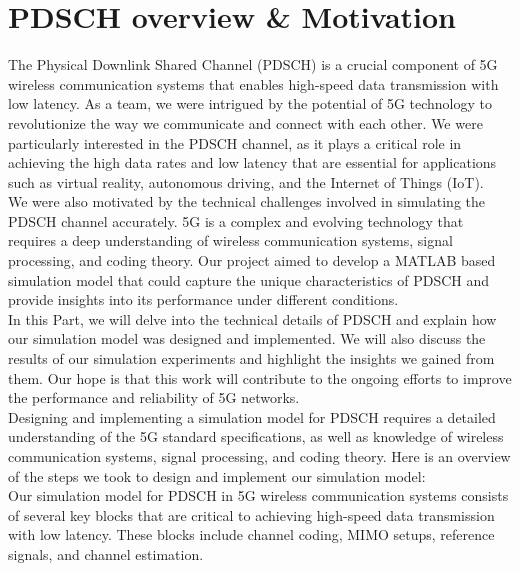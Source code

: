 \section*{PDSCH overview \& Motivation}

The Physical Downlink Shared Channel (PDSCH) is a crucial component of 5G wireless communication systems that enables high-speed data transmission with low latency. As a team, we were intrigued by the potential of 5G technology to revolutionize the way we communicate and connect with each other. We were particularly interested in the PDSCH channel, as it plays a critical role in achieving the high data rates and low latency that are essential for applications such as virtual reality, autonomous driving, and the Internet of Things (IoT). \\
We were also motivated by the technical challenges involved in simulating the PDSCH channel accurately. 5G is a complex and evolving technology that requires a deep understanding of wireless communication systems, signal processing, and coding theory. Our project aimed to develop a MATLAB based simulation model that could capture the unique characteristics of PDSCH and provide insights into its performance under different conditions. \\

In this Part, we will delve into the technical details of PDSCH and explain how our simulation model was designed and implemented. We will also discuss the results of our simulation experiments and highlight the insights we gained from them. Our hope is that this work will contribute to the ongoing efforts to improve the performance and reliability of 5G networks. \\
Designing and implementing a simulation model for PDSCH requires a detailed understanding of the 5G standard specifications, as well as knowledge of wireless communication systems, signal processing, and coding theory. Here is an overview of the steps we took to design and implement our simulation model: \\
Our simulation model for PDSCH in 5G wireless communication systems consists of several key blocks that are critical to achieving high-speed data transmission with low latency. These blocks include channel coding, MIMO setups, reference signals, and channel estimation. \\

